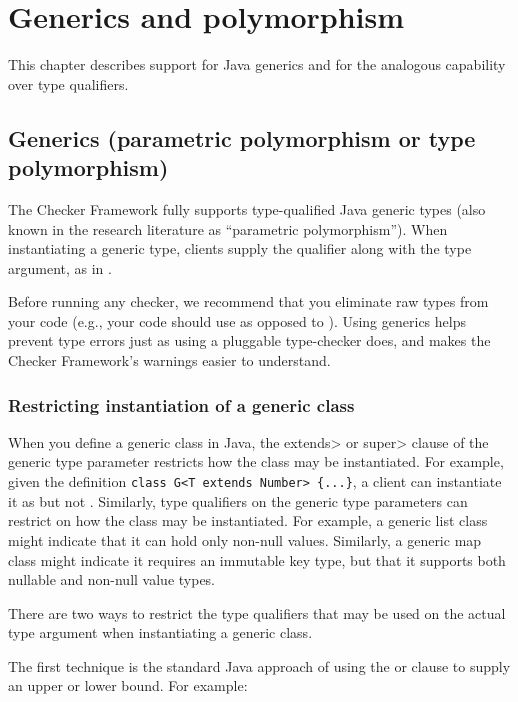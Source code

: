 \htmlhr
\chapter{Generics and polymorphism\label{polymorphism}}

This chapter describes support for Java generics and for the analogous
capability over type qualifiers.


\section{Generics (parametric polymorphism or type polymorphism)\label{generics}}

The Checker Framework fully supports
type-qualified Java generic types (also known in the research literature as ``parametric
polymorphism'').
When instantiating a generic type,
clients supply the qualifier along with the type argument, as in
.

Before running any checker, we recommend that you eliminate
raw types from your code (e.g., your code should use  as
opposed to ).
Using generics helps prevent type errors just as using a pluggable
type-checker does, and makes the Checker Framework's warnings easier to
understand.


\subsection{Restricting instantiation of a generic class}

When you define a generic class in Java, the \<extends> or \<super> clause
of the generic type parameter restricts
how the class may be instantiated.  For example, given the definition
\verb|class G<T extends Number> {...}|,
a client can instantiate it as  but not .
Similarly, type qualifiers on the generic type parameters can restrict on
how the class may be instantiated.  For example, a generic list class might
indicate that it can hold only non-null values.  Similarly, a generic map
class might indicate it requires an immutable key type, but that it
supports both nullable and non-null value types.


There are two ways to restrict the type qualifiers that may be used on
the actual type argument when instantiating a generic class.

The first technique is the standard Java approach of using the
 or  clause to supply an upper or lower bound.
For example:

